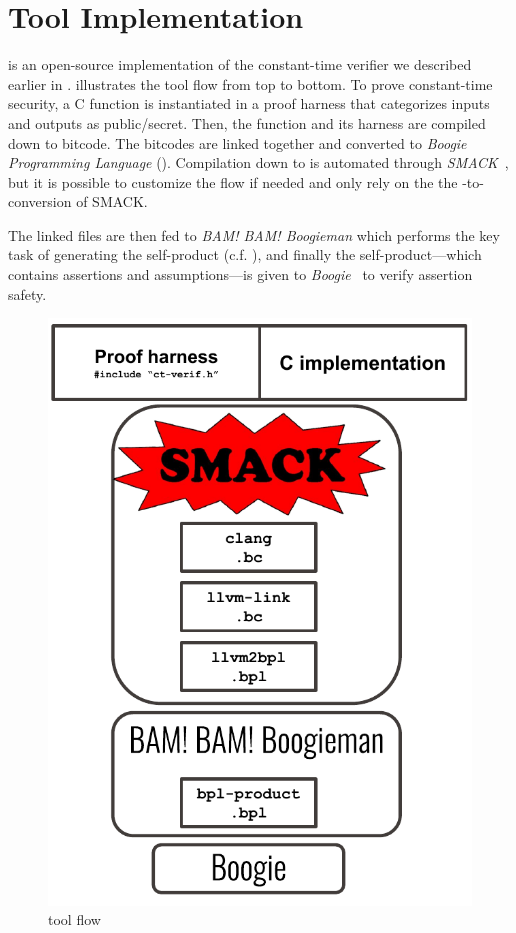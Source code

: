 \section{Tool Implementation}

\ctVerif is an open-source implementation of the constant-time verifier we
described earlier in .  illustrates the
tool flow from top to bottom. To prove constant-time security, a C function is
instantiated in a proof harness that categorizes inputs and outputs as public/secret. Then,
the function and its harness are compiled down to  bitcode. The
bitcodes are linked together and converted to \emph{Boogie Programming
Language} (). Compilation down to  is automated
through \emph{SMACK}~\cite{smack}, but it is possible to customize the flow if
needed and only rely on the the -to- conversion
of SMACK.

The linked  files are then fed to \emph{BAM! BAM! Boogieman} which
performs the key task of generating the self-product (c.f. ), and
finally the self-product---which contains assertions and assumptions---is
given to \emph{Boogie}~\cite{boogie} to verify assertion safety.


\begin{figure}[h]
    \centering
    \includegraphics[height=0.4\textheight]{figs/ct-verif-flow.pdf}
    \caption{\ctVerif tool flow}
    \label{fig:ct-verif-flow}
\end{figure}




